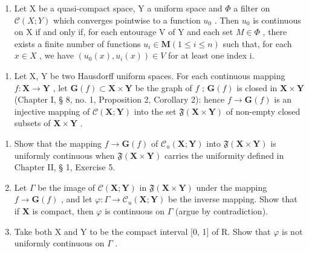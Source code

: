 \begin{enumerate}
\def\labelenumi{\alph{enumi})}
\setcounter{enumi}{1}
\tightlist
\item
  Let X be a quasi-compact space, Y a uniform space and \(\Phi\) a filter on \(\mathcal{C}(X;Y)\) which converges pointwise to a function \(u_{0}\) . Then \(u_{0}\) is continuous on X if and only if, for each entourage V of Y and each set \(M\in\Phi\) , there exists a finite number of functions \(u_{i}\in\mathbf{M}(1\leqslant i\leqslant n)\) such that, for each \(x\in X\) , we have \((u_{0}(x),u_{i}(x))\in V\) for at least one index i.
\end{enumerate}

\begin{enumerate}
\def\labelenumi{\arabic{enumi})}
\setcounter{enumi}{6}
\tightlist
\item
  Let X, Y be two Hausdorff uniform spaces. For each continuous mapping \(f: \mathbf{X} \to \mathbf{Y}\) , let \(\mathbf{G}(f) \subset \mathbf{X} \times \mathbf{Y}\) be the graph of \(f\) ; \(\mathbf{G}(f)\) is closed in \(\mathbf{X} \times \mathbf{Y}\) (Chapter I, § 8, no. 1, Proposition 2, Corollary 2): hence \(f \to \mathbf{G}(f)\) is an injective mapping of \(\mathcal{C}(\mathbf{X}; \mathbf{Y})\) into the set \(\mathfrak{F}(\mathbf{X} \times \mathbf{Y})\) of non-empty closed subsets of \(\mathbf{X} \times \mathbf{Y}\) .
\end{enumerate}

\begin{enumerate}
\def\labelenumi{\alph{enumi})}
\item
  Show that the mapping \(f \to \mathbf{G}(f)\) of \(\mathcal{C}_u(\mathbf{X};\mathbf{Y})\) into \(\mathfrak{F}(\mathbf{X}\times \mathbf{Y})\) is uniformly continuous when \(\mathfrak{F}(\mathbf{X}\times \mathbf{Y})\) carries the uniformity defined in Chapter II, § 1, Exercise 5.
\item
  Let \(\Gamma\) be the image of \(\mathcal{C}(\mathbf{X};\mathbf{Y})\) in \(\mathfrak{F}(\mathbf{X}\times \mathbf{Y})\) under the mapping \(f\to \mathbf{G}(f)\) , and let \(\varphi :\Gamma \to \mathcal{C}_u(\mathbf{X};\mathbf{Y})\) be the inverse mapping. Show that if \(\mathbf{X}\) is compact, then \(\varphi\) is continuous on \(\Gamma\) (argue by contradiction).
\item
  Take both X and Y to be the compact interval {[}0, 1{]} of R. Show that \(\varphi\) is not uniformly continuous on \(\Gamma\) .
\end{enumerate}

